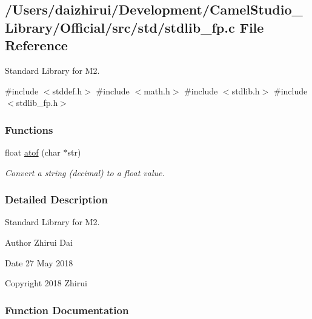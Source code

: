 \hypertarget{a00122}{}\subsection{/\+Users/daizhirui/\+Development/\+Camel\+Studio\+\_\+\+Library/\+Official/src/std/stdlib\+\_\+fp.c File Reference}
\label{a00122}


Standard Library for M2.  


{\ttfamily \#include $<$stddef.\+h$>$}\newline
{\ttfamily \#include $<$math.\+h$>$}\newline
{\ttfamily \#include $<$stdlib.\+h$>$}\newline
{\ttfamily \#include $<$stdlib\+\_\+fp.\+h$>$}\newline
\subsubsection*{Functions}
\begin{DoxyCompactItemize}
\item 
float \mbox{\hyperlink{a00122_a40bb24dc7d4d98600cd976323cea17e0}{atof}} (char $\ast$str)
\begin{DoxyCompactList}\small\item\em Convert a string (decimal) to a float value. \end{DoxyCompactList}\end{DoxyCompactItemize}


\subsubsection{Detailed Description}
Standard Library for M2. 

\begin{DoxyAuthor}{Author}
Zhirui Dai 
\end{DoxyAuthor}
\begin{DoxyDate}{Date}
27 May 2018 
\end{DoxyDate}
\begin{DoxyCopyright}{Copyright}
2018 Zhirui 
\end{DoxyCopyright}


\subsubsection{Function Documentation}
\mbox{\label{a00122_a40bb24dc7d4d98600cd976323cea17e0}} 
